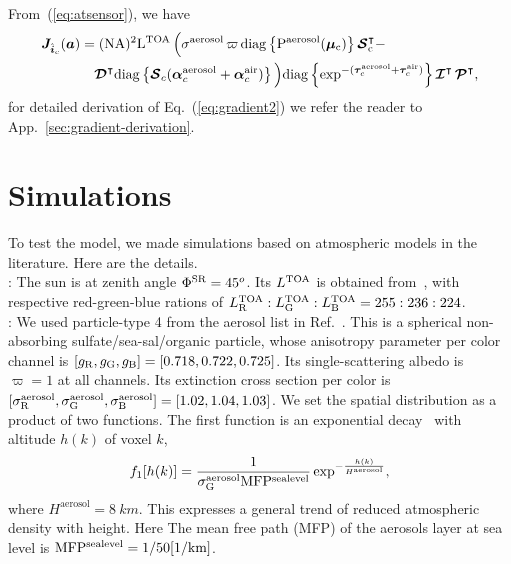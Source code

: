 \documentclass[10pt,twocolumn,letterpaper]{article}
\newcommand{\OpSphere}{\bm{\mathcal{S}}}
\newcommand{\OpDistance}{\bm{\mathcal{D}}}
\newcommand{\OpInt}{\bm{\mathcal{I}}}
\newcommand{\OpCamera}{\bm{\mathcal{P}}}
\newcommand{\OpDiag}[1]{\mathrm{diag}\left\{#1\right\}}
\newcommand{\vect}[1]{\bm{#1}}
\newcommand{\mat}[1]{\bm{#1}}
\newcommand{\transpose}[1]{{#1}^\intercal}
\begin{document}
\noindent From~(\ref{eq:atsensor}), we have
\begin{align}
  \mat{J}_{\hat{\vect{i}}_c}(\vect{a}) &= (\rm{NA})^2 \mathrm{L}^{\rm TOA}\,
  \Big( \sigma^{\rm aerosol} \, \varpi \, \OpDiag{P^{\rm
        aerosol}(\vect{\mu}_c)} \transpose{\OpSphere}_c - \nonumber \\
    &\quad \transpose{\OpDistance} \OpDiag{\OpSphere_c (\vect{\alpha}^{\rm
        aerosol}_c +
      \vect{\alpha}^{\rm air}_c )} \Big)
  \OpDiag{\exp^{-(\vect{\tau}^{\rm aerosol}_c + \vect{\tau}^{\rm
        air}_c)}} \transpose{\OpInt} \, \transpose{\OpCamera},
  \label{eq:gradient2}
\end{align}
for detailed derivation of Eq.~(\ref{eq:gradient2}) we refer the
reader to App.~\ref{sec:gradient-derivation}.

\section{Simulations}
\label{sec:simul}

To test the model, we made simulations based on atmospheric models in the literature. Here are the details.\\

: The sun is at zenith angle $\Phi^{\rm SR}=45^o$. Its
$L^{\rm TOA}$ is obtained from~\cite{sun_composition,BBradiance}, with respective red-green-blue rations of
 $L^{\rm TOA}_{\rm R}:L^{\rm TOA}_{\rm G}:L^{\rm TOA}_{\rm B}=255:236:224$.\\

: We used particle-type 4 from the aerosol list in
Ref.~\cite{Martonchik2009}. This is a spherical non-absorbing sulfate/sea-sal/organic particle, whose anisotropy parameter per color channel is $[g_{\rm R},g_{\rm G},g_{\rm B}]=[0.718,0.722,0.725]$. Its single-scattering albedo is $\varpi=1$ at all channels. Its extinction cross section per color is
  $[\sigma^{\rm aerosol}_{\rm R},
    \sigma^{\rm aerosol}_{\rm G},
    \sigma^{\rm aerosol}_{\rm B}]=[1.02,1.04,1.03]$.
We set the spatial distribution as a product of two functions. The first function is an exponential decay~\cite{Levi1980} with altitude $h(k)$ of voxel $k$,
\begin{align}
 f_1[h(k)] = \frac{1}
 {\sigma^{\rm aerosol}_{\rm G} \mathrm{MFP^{sea level}}}
  \exp^{-\frac{h(k)}{H^\mathrm{aerosol}}},
\end{align}
where $H^\mathrm{aerosol}=8\ km$. This expresses a general trend of reduced atmospheric density with height. Here
The mean free path (MFP) of the aerosols layer at sea level is
$\mathrm{MFP^{sea level}}=1/50 {\rm[1/km]}$.
\end{document}

